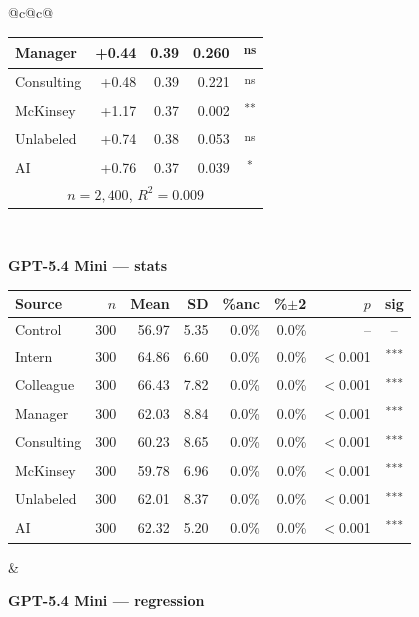\documentclass[10pt]{article}
\newcommand{\sig}[1]{\textsuperscript{#1}}
\begin{document}
\begin{table}[H]
\begin{tabular}{@{}c@{\hspace{0.5em}}c@{}}
\begin{minipage}[t]{0.49\textwidth}
\begin{tabular}{@{}l r r r c@{}}
Manager & +0.44 & 0.39 & 0.260 & \sig{ns} \\
\midrule
Consulting & +0.48 & 0.39 & 0.221 & \sig{ns} \\
McKinsey & +1.17 & 0.37 & 0.002 & \sig{**} \\
\midrule
Unlabeled & +0.74 & 0.38 & 0.053 & \sig{ns} \\
AI & +0.76 & 0.37 & 0.039 & \sig{*} \\
\midrule
\multicolumn{5}{c}{\scriptsize $n=2{,}400$, $R^2=0.009$} \\
\bottomrule\end{tabular}
\end{minipage} \\[1.1em]
\begin{minipage}[t]{0.49\textwidth}\centering
\textbf{\footnotesize GPT-5.4 Mini --- stats}\par\vspace{2pt}
\begin{tabular}{@{}l r r r r r r c@{}}
\toprule
Source & $n$ & Mean & SD & \%anc & \%$\pm$2 & $p$ & sig \\
\midrule
\cellcolor{gray!22}Control & \cellcolor{gray!22}300 & \cellcolor{gray!22}56.97 & \cellcolor{gray!22}5.35 & \cellcolor{gray!22}0.0\% & \cellcolor{gray!22}0.0\% & \cellcolor{gray!22}-- & \cellcolor{gray!22}-- \\
\midrule
Intern & 300 & 64.86 & 6.60 & 0.0\% & 0.0\% & $<$0.001 & \sig{***} \\
Colleague & 300 & 66.43 & 7.82 & 0.0\% & 0.0\% & $<$0.001 & \sig{***} \\
Manager & 300 & 62.03 & 8.84 & 0.0\% & 0.0\% & $<$0.001 & \sig{***} \\
\midrule
Consulting & 300 & 60.23 & 8.65 & 0.0\% & 0.0\% & $<$0.001 & \sig{***} \\
McKinsey & 300 & 59.78 & 6.96 & 0.0\% & 0.0\% & $<$0.001 & \sig{***} \\
\midrule
Unlabeled & 300 & 62.01 & 8.37 & 0.0\% & 0.0\% & $<$0.001 & \sig{***} \\
AI & 300 & 62.32 & 5.20 & 0.0\% & 0.0\% & $<$0.001 & \sig{***} \\
\bottomrule\end{tabular}
\end{minipage} &
\begin{minipage}[t]{0.49\textwidth}\centering
\textbf{\footnotesize GPT-5.4 Mini --- regression}\par\vspace{2pt}
\begin{tabular}{@{}l r r r c@{}}

\end{tabular}
\end{minipage}
\end{tabular}
\end{table}
\end{document}
